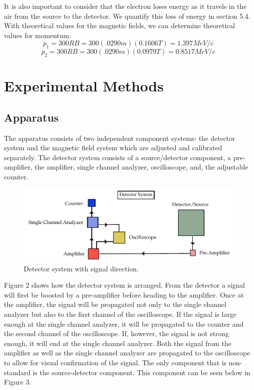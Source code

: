 It is also important to consider  that the electron loses energy as it travels in the air from the source to the detector. We quantify this loss of energy in section 5.4. With theoretical values for the magnetic fields, we can determine theoretical values for momentum:
\begin{equation}p_1=300RB=300(.0290m)(0.1606T)=1.397 MeV/c\end{equation}
\begin{equation}p_2=300RB=300(.0290m)(0.0979T)=0.8517 MeV/c\end{equation}

\section{Experimental Methods}
\subsection{Apparatus}
The apparatus consists of two independent component systems: the detector system and the magnetic field system which are adjusted and calibrated separately.  The detector system consists of a source/detector component, a pre-amplifier, the amplifier, single channel analyzer, oscilloscope, and, the adjustable counter.

\begin{figure}[H]
\begin{center}
\includegraphics[width=4 in]{REM-figures.pdf}
\caption{Detector system with signal direction.}
\end{center}
\end{figure}

Figure 2 shows how the detector system is arranged.  From the detector a signal will first be boosted by a pre-amplifier before heading to the amplifier. Once at the amplifier, the signal will be propagated not only to the single channel analyzer but also to the first channel of the oscilloscope. If the signal is large enough at the single channel analyzer, it will be propagated to the counter and the second channel of the oscilloscope. If, however, the signal is not strong enough, it will end at the single channel analyzer. Both the signal from the amplifier as well as the single channel analyzer are propagated to the oscilloscope to allow for visual confirmation of the signal.  
The only component that is non-standard is the source-detector component.  This component can be seen below in Figure 3.
 
